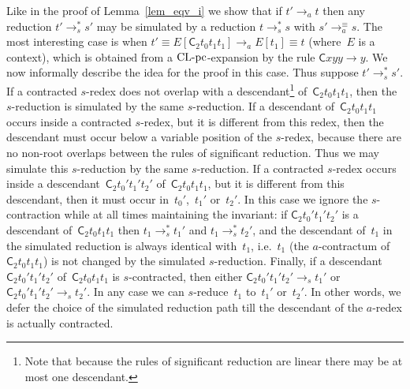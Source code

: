 \documentclass[a4paper,UKenglish]{lipics-v2016}
\newcommand{\Cs}{\mathsf{C}}
\newcommand{\CLCz}{{\mbox{$\text{\rm CL-pc}$}}}
\begin{document}
Like in the proof of Lemma~\ref{lem_eqv_i} we show that if
$t' \to_a t$ then any reduction $t' \to_s^{*} s'$ may be simulated by
a reduction $t \to_s^{*} s$ with $s' \to_a^{\equiv} s$. The most
interesting case is when
$t' \equiv E[\Cs_2 t_0 t_1 t_1] \to_a E[t_1] \equiv t$ (where~$E$ is a
context), which is obtained from a $\CLCz$-expansion by the rule
$\Cs x y y \to y$. We now informally describe the idea for the proof
in this case. Thus suppose $t' \to_s^{*} s'$. If a contracted
$s$-redex does not overlap with a descendant\footnote{Note that
  because the rules of significant reduction are linear there may be
  at most one descendant.} of~$\Cs_2 t_0 t_1 t_1$, then the
$s$-reduction is simulated by the same $s$-reduction. If a descendant
of~$\Cs_2 t_0 t_1 t_1$ occurs inside a contracted $s$-redex, but it is
different from this redex, then the descendant must occur below a
variable position of the $s$-redex, because there are no non-root
overlaps between the rules of significant reduction. Thus we may
simulate this $s$-reduction by the same $s$-reduction. If a contracted
$s$-redex occurs inside a descendant~$\Cs_2 t_0' t_1' t_2'$
of~$\Cs_2 t_0 t_1 t_1$, but it is different from this descendant, then
it must occur in~$t_0'$,~$t_1'$ or~$t_2'$. In this case we ignore the
$s$-contraction while at all times maintaining the invariant: if
$\Cs_2 t_0' t_1' t_2'$ is a descendant of~$\Cs_2 t_0 t_1 t_1$ then
$t_1 \to_s^{*} t_1'$ and $t_1 \to_s^{*} t_2'$, and the descendant
of~$t_1$ in the simulated reduction is always identical with~$t_1$,
i.e.~$t_1$ (the $a$-contractum of $\Cs_2 t_0 t_1 t_1$) is not changed
by the simulated $s$-reduction. Finally, if a
descendant~$\Cs_2 t_0' t_1' t_2'$ of~$\Cs_2 t_0 t_1 t_1$ is
$s$-contracted, then either $\Cs_2 t_0' t_1' t_2' \to_s t_1'$ or
$\Cs_2 t_0' t_1' t_2' \to_s t_2'$. In any case we can $s$-reduce~$t_1$
to~$t_1'$ or~$t_2'$. In other words, we defer the choice of the
simulated reduction path till the descendant of the $a$-redex is
actually contracted.
\end{document}

